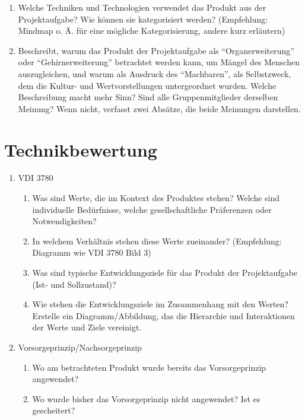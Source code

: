 \documentclass[DIV=15,headinclude=true]{scrartcl}
\begin{document}
\begin{enumerate}
	\item
	      Welche Techniken und Technologien verwendet das Produkt aus der
	      Projektaufgabe? Wie können sie kategorisiert werden? (Empfehlung:
	      Mindmap o. Ä. für eine mögliche Kategorisierung, andere kurz
	      erläutern)
	\item
	      Beschreibt, warum das Produkt der Projektaufgabe als
	      ``Organerweiterung'' oder ``Gehirnerweiterung'' betrachtet werden
	      kann, um Mängel des Menschen auszugleichen, und warum als Ausdruck des
	      ``Machbaren'', als Selbstzweck, dem die Kultur- und Wertvorstellungen
	      untergeordnet wurden. Welche Beschreibung macht mehr Sinn? Sind alle
	      Gruppenmitglieder derselben Meinung? Wenn nicht, verfasst zwei
	      Absätze, die beide Meinungen darstellen.
\end{enumerate}

\section{Technikbewertung} \label{technikbewertung}

\begin{enumerate}
	\item
	      VDI 3780

	      \begin{enumerate}
		      \item
		            Was sind Werte, die im Kontext des Produktes stehen? Welche sind
		            individuelle Bedürfnisse, welche gesellschaftliche Präferenzen oder
		            Notwendigkeiten?
		      \item
		            In welchem Verhältnis stehen diese Werte zueinander? (Empfehlung:
		            Diagramm wie VDI 3780 Bild 3)
		      \item
		            Was sind typische Entwicklungsziele für das Produkt der
		            Projektaufgabe (Ist- und Sollzustand)? \label{entwicklungsziele}
		      \item
		            Wie stehen die Entwicklungsziele im Zusammenhang mit den Werten?
		            Erstelle ein Diagramm/Abbildung, das die Hierarchie und
		            Interaktionen der Werte und Ziele vereinigt.
	      \end{enumerate}
	\item
	      Vorsorgeprinzip/Nachsorgeprinzip

	      \begin{enumerate}
		      \item
		            Wo am betrachteten Produkt wurde bereits das Vorsorgeprinzip
		            angewendet?
		      \item
		            Wo wurde bisher das Vorsorgeprinzip nicht angewendet? Ist es
		            gescheitert?
	      \end{enumerate}
\end{enumerate}
\end{document}
